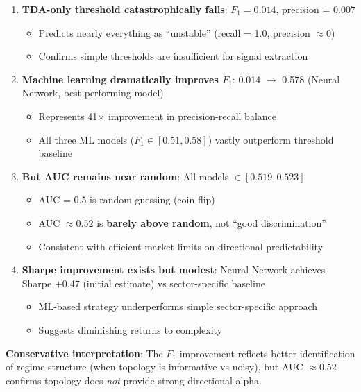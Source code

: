 \begin{enumerate}
    \item \textbf{TDA-only threshold catastrophically fails}: $F_1 = 0.014$, precision = 0.007
        \begin{itemize}
            \item Predicts nearly everything as ``unstable'' (recall = 1.0, precision $\approx 0$)
            \item Confirms simple thresholds are insufficient for signal extraction
        \end{itemize}

    \item \textbf{Machine learning dramatically improves $F_1$}: 0.014 $\rightarrow$ 0.578 (Neural Network, best-performing model)
        \begin{itemize}
            \item Represents 41$\times$ improvement in precision-recall balance
            \item All three ML models ($F_1 \in [0.51, 0.58]$) vastly outperform threshold baseline
        \end{itemize}

    \item \textbf{But AUC remains near random}: All models $\in [0.519, 0.523]$
        \begin{itemize}
            \item AUC = 0.5 is random guessing (coin flip)
            \item AUC $\approx 0.52$ is \textbf{barely above random}, not ``good discrimination''
            \item Consistent with efficient market limits on directional predictability
        \end{itemize}

    \item \textbf{Sharpe improvement exists but modest}: Neural Network achieves Sharpe $+0.47$ (initial estimate) vs sector-specific baseline
        \begin{itemize}
            \item ML-based strategy underperforms simple sector-specific approach
            \item Suggests diminishing returns to complexity
        \end{itemize}
\end{enumerate}

\textbf{Conservative interpretation}: \mlguardrail{} The $F_1$ improvement reflects better identification of regime structure (when topology is informative vs noisy), but AUC $\approx 0.52$ confirms topology does \textit{not} provide strong directional alpha.

